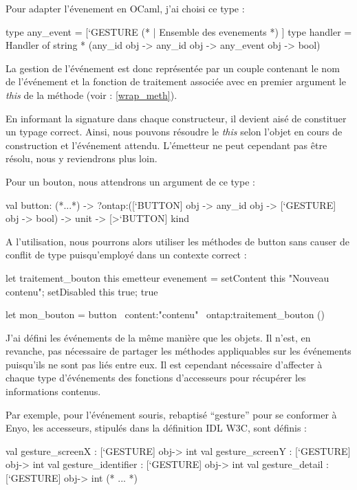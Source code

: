 \documentclass[11pt,a4paper]{report}
\begin{document}
Pour adapter l'évenement en OCaml, j'ai choisi ce type :
\begin{OCaml}
  type any_event = [`GESTURE (* |  Ensemble des evenements *) ]
  type handler = Handler of string * (any_id obj -> any_id obj -> any_event obj -> bool)
\end{OCaml}

La gestion de l'événement est donc représentée par un couple contenant le nom de l'événement et la 
fonction de traitement associée avec en premier argument le \emph{this} de la méthode (voir : \ref{wrap_meth}).

En informant la signature dans chaque constructeur, il devient aisé de constituer un typage correct.
Ainsi, nous pouvons résoudre le \emph{this} selon l'objet en cours de construction et l'événement attendu.
L'émetteur ne peut cependant pas être résolu, nous y reviendrons plus loin.

Pour un bouton, nous attendrons un argument de ce type :

\begin{OCaml}
  val button:
    (*...*)
    -> ?ontap:([`BUTTON] obj -> any_id obj -> [`GESTURE] obj -> bool)
    -> unit -> [>`BUTTON] kind
\end{OCaml}

A l'utilisation, nous pourrons alors utiliser les méthodes de button sans causer de conflit de type 
puisqu'employé dans un contexte correct :

\begin{OCaml}
let traitement_bouton this emetteur evenement = 
   setContent this "Nouveau contenu";
   setDisabled this true;
   true

let mon_bouton = button ~content:"contenu" ~ontap:traitement_bouton ()
\end{OCaml}

J'ai défini les événements de la même manière que les objets. Il n'est, en revanche, pas nécessaire 
de partager les méthodes appliquables sur les  événements puisqu'ils ne sont pas liés entre eux. Il 
est cependant nécessaire d'affecter à chaque type d'événements des fonctions d'accesseurs pour 
récupérer les informations contenus.

Par exemple, pour l'événement souris, rebaptisé ``gesture'' pour se conformer à Enyo, les accesseurs,
stipulés dans la définition IDL W3C, sont définis :

\begin{OCaml}
  val gesture_screenX : [`GESTURE] obj-> int
  val gesture_screenY : [`GESTURE] obj-> int
  val gesture_identifier : [`GESTURE] obj-> int
  val gesture_detail : [`GESTURE] obj-> int
  (* ... *)
\end{OCaml}
\medskip
\end{document}
